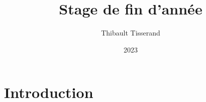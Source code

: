 \documentclass{beamer}
\title{Stage de fin d'année}
\author{Thibault Tisserand}
\institute{Université de Lille}
\date{2023}
\begin{document}
\titlepage



\section{Introduction}

\end{document}
